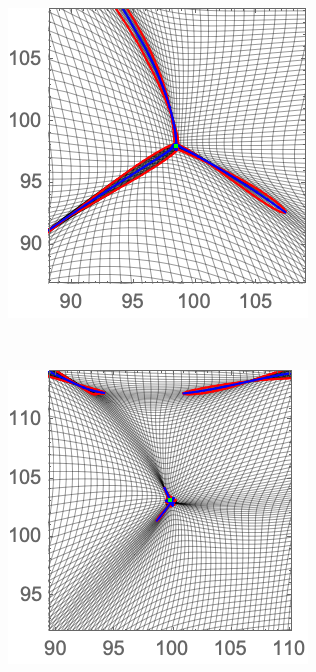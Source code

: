 \documentclass[a4paper, 11pt]{article}
\begin{document}
\begin{figure}
\begin{subfigure}[b]{0.24\textwidth}
\end{subfigure}~
\begin{subfigure}[b]{0.24\textwidth}
\includegraphics[width=\textwidth]{Swallowtail_Nb_Zoom}
\end{subfigure}~
\begin{subfigure}[b]{0.24\textwidth}
\includegraphics[width=\textwidth]{Elliptic_Nb_Zoom}

\end{subfigure}
\end{figure}
\end{document}
